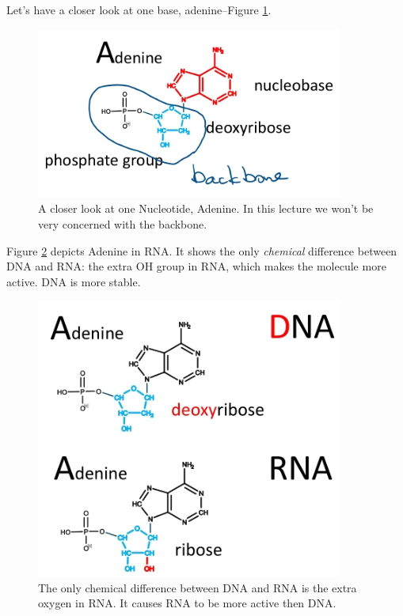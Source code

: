 \documentclass[]{article}
\begin{document}
Let's have a closer look at one base, adenine--Figure \ref{fig:NucleotideAdenine}.
\begin{figure}[H]
	\caption[A closer look at one Nucleotide, Adenine]{A closer look at one Nucleotide, Adenine. In this lecture we won't be very concerned with the backbone.}\label{fig:NucleotideAdenine} 
	\includegraphics[width=0.9\textwidth]{NucleotideAdenine}
\end{figure}

Figure \ref{fig:NucleotideDNARNA} depicts Adenine in RNA. It shows the only \emph{chemical} difference between DNA and RNA: the extra OH group in RNA, which makes the molecule more active. DNA is more stable.
\begin{figure}[H]
	\caption{The only chemical difference between DNA and RNA is the extra oxygen in RNA. It causes RNA to be more active then DNA.}\label{fig:NucleotideDNARNA} 
	\includegraphics[width=0.9\textwidth]{NucleotideDNARNA}
\end{figure}
\end{document}
